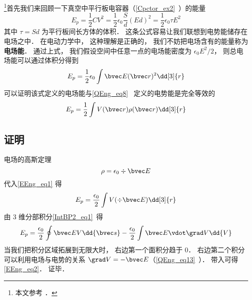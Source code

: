 

\footnote{本文参考 \cite{GriffE}．}首先我们来回顾一下真空中平行板电容器（\autoref{Cpctor_ex2}~）的能量
\begin{equation}
E_p = \frac12 CV^2 = \frac12 \epsilon_0 \frac Sd (Ed)^2 = \frac 12 \epsilon_0 \tau E^2
\end{equation}
其中 $\tau = Sd$ 为平行板间长方体的体积． 这条公式容易让我们联想到电势能储存在电场之中． 在电动力学中， 这种理解是正确的， 我们不妨把电场含有的能量称为\textbf{电场能}． 通过上式， 我们假设空间中任意一点的电场能密度为 $\epsilon_0 E^2/2$， 则总电场能可以通过体积分得到
\begin{equation}\label{EEng_eq2}
E_p = \frac12 \epsilon_0 \int \bvec E(\bvec r)^2 \dd[3]{r}
\end{equation}
可以证明该式定义的电场能与\autoref{QEng_eq8}~ 定义的电势能是完全等效的
\begin{equation}\label{EEng_eq1}
E_p = \frac 12 \int V(\bvec r) \rho(\bvec r) \dd[3]{r}
\end{equation}

\subsection{证明}

电场的高斯定理
\begin{equation}
\rho = \epsilon_0\div \bvec E
\end{equation}
代入\autoref{EEng_eq1} 得
\begin{equation}
E_p = \frac{\epsilon_0}2 \int V (\div \bvec E) \dd[3]{r}
\end{equation}
由 3 维分部积分\autoref{IntBP2_eq1}~得
\begin{equation}
E_p = \frac{\epsilon_0}2 \oint \bvec E V \dd{\bvec s} - \frac{\epsilon_0}{2} \int \bvec E \vdot \grad V \dd{V}
\end{equation}
当我们把积分区域拓展到无限大时， 右边第一个面积分趋于 0． 右边第二个积分可以利用电场与电势的关系 $\grad V = -\bvec E$（\autoref{QEng_eq13}~）． 带入可得\autoref{EEng_eq2}． 证毕．
